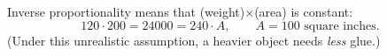 Inverse proportionality means that (weight)$\times$(area) is constant:
\[120\cdot200=24000=240\cdot A,\qquad A=\boxed{100}\text{ square inches}.\]
(Under this unrealistic assumption, a heavier object needs \emph{less} glue.)
